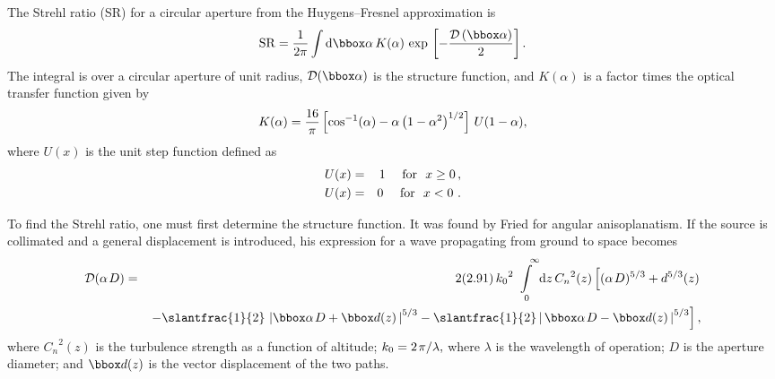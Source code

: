 The Strehl ratio (SR) for a circular aperture \cite{7} from  the
Huygens--Fresnel approximation is  \begin{eqnarray}{\rm  SR}
={1 \over {2\pi }}\int {{\rm d}\bbox  \alpha }\,K(\alpha )\,\exp
\,\left[ {-{{{\cal D}\left( {\bbox \alpha } \right)}  \over 2}}
\right].\end{eqnarray}  The integral is over a circular aperture of
unit radius,  ${\cal D}( {\bbox \alpha } )$  is the structure
function, and  $K(\alpha )$  is a  factor times the optical
transfer function given by  \begin{eqnarray}K(\alpha )={{16} \over
\pi }\left[ {\cos ^{- 1}(\alpha )-\alpha \left( {1-\alpha ^2}
\right)^{1/ 2}} \right]\,U(1- \alpha ),\end{eqnarray}  where
$U\left(  x \right)$  is the unit step function defined as
\begin{eqnarray} U( x )&=&1\,\,\,\,\,\,\,\,{\rm for}\,\,\,\,x\ge
0\,,  \nonumber \\   U( x )&=&0\,\,\,\,\,\,\,\,{\rm
for}\,\,\,\,x<0\,\,.    \end{eqnarray}

To find  the Strehl ratio, one must first determine the structure
function.  It  was found by Fried\cite{4}  for angular
anisoplanatism.  If the source  is collimated and a general
displacement is introduced, his expression  for a wave propagating
from ground to space becomes
\begin{eqnarray}
{\cal D}({\alpha
\kern 1ptD} )&=& 2(2.91)\,{k_0}^2\int\limits_{\,\,\; 0}^{\,\,\,\,\,\;
\infty}   {\rm d}z\,{C_n}^2(z)\left[ {( {\alpha \kern 1ptD}  )^{5/
3}+d^{5/ 3}(z)}\right.  \nonumber\\
&&\left.
{-{\slantfrac{1}{2}}\,\left| {{\bbox \alpha} \kern 1ptD+{\bbox
d}(z)\,} \right|^{5/ 3} -{\textstyle \slantfrac{1}{2}}\left|
{\,{\bbox \alpha}  \kern 1ptD-{\bbox d}(z)\,} \right|^{5 / 3}}
\right],
\end{eqnarray}
where  ${C_n}^2(z)$  is the turbulence
strength as a function of altitude;  $k_0=2\kern 1pt\pi / \lambda
,$  where $\lambda $ is the wavelength  of operation; $D$ is the
aperture diameter; and  ${\bbox d}(z)$   is the vector displacement
of the two paths.

